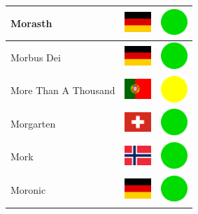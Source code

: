 \documentclass[12pt, a4paper, twoside]{report}
\begin{document}
\begin{center}
\begin{longtable}{|p{5cm}|p{2cm}|p{2cm}|}
 Morasth                                                    & \includegraphics[width=1cm]{../img/flags/de} &   \includegraphics[width=1cm]{../likes/y} \\ \hline
 Morbus Dei                                                 & \includegraphics[width=1cm]{../img/flags/de} &   \includegraphics[width=1cm]{../likes/y} \\ \hline
 More Than A Thousand                                       & \includegraphics[width=1cm]{../img/flags/pt} &   \includegraphics[width=1cm]{../likes/m} \\ \hline
 Morgarten                                                  & \includegraphics[width=1cm]{../img/flags/ch} &   \includegraphics[width=1cm]{../likes/y} \\ \hline
 Mork                                                       & \includegraphics[width=1cm]{../img/flags/no} &   \includegraphics[width=1cm]{../likes/y} \\ \hline
 Moronic                                                    & \includegraphics[width=1cm]{../img/flags/de} &   \includegraphics[width=1cm]{../likes/y} \\ \hline

\end{longtable}
\end{center}
\end{document}
